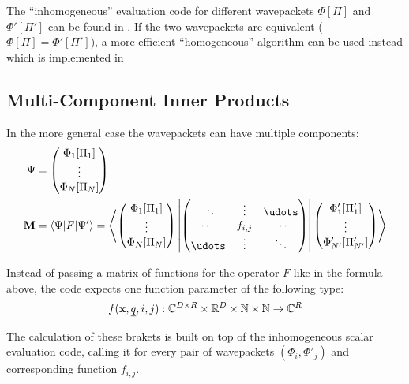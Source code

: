 The ``inhomogeneous'' evaluation code for different wavepackets $\Phi[\Pi]$
and $\Phi'[\Pi']$ can be found in
.
If the two wavepackets are equivalent ($\Phi[\Pi] = \Phi'[\Pi']$), a more efficient
``homogeneous'' algorithm can be used instead which is implemented in


\subsection{Multi-Component Inner Products}

In the more general case the wavepackets can have multiple components:
\begin{align}
  \Psi &= \begin{pmatrix} \Phi_1[\Pi_1] \\ \vdots \\ \Phi_N[\Pi_N] \end{pmatrix} \\
  \mat{M} &= \langle \Psi | F | \Psi' \rangle = \left\langle
    \begin{pmatrix} \Phi_1[\Pi_1] \\ \vdots \\ \Phi_N[\Pi_N] \end{pmatrix} \left|
    \begin{pmatrix} \ddots & \vdots & \udots \\ \cdots & f_{i,j} & \cdots \\
      \udots & \vdots & \ddots \end{pmatrix} \right|
    \begin{pmatrix} \Phi'_1[\Pi_1'] \\ \vdots \\ \Phi'_{N'}[\Pi_{N'}'] \end{pmatrix}
    \right\rangle
\end{align}

Instead of passing a matrix of functions for the operator $F$ like in the
formula above, the code expects one function parameter of the following type:
\begin{equation}
  f(\mathbf{x}, \underline{q}, i, j) : \mathbb{C}^{D \times R} \times \mathbb{R}^D
  \times \mathbb{N} \times \mathbb{N} \rightarrow \mathbb{C}^R
\end{equation}

The calculation of these brakets is built on top of the inhomogeneous scalar
evaluation code, calling it for every pair of wavepackets $(\Phi_i,\Phi'_j)$ and
corresponding function $f_{i,j}$.

